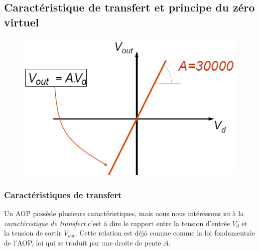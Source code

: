 \documentclass	[11pt, a4paper, openany]{book}
\begin{document}
\subsection{Caractéristique de transfert et principe du zéro virtuel}\begin{figure}
\includegraphics[scale=0.25]{img/image42}
\end{figure}
\subsubsection{Caractéristiques de transfert}

Un AOP possède plusieurs caractéristiques, mais nous nous intéressons ici à la \textit{caractéristique de transfert} c'est à dire le rapport entre la tension d'entrée $V_d$ et la tension de sortir $V_{out}$. Cette relation est déjà connue comme la loi fondamentale de l'AOP, loi qui se traduit par une droite de pente $A$.
\end{document}
